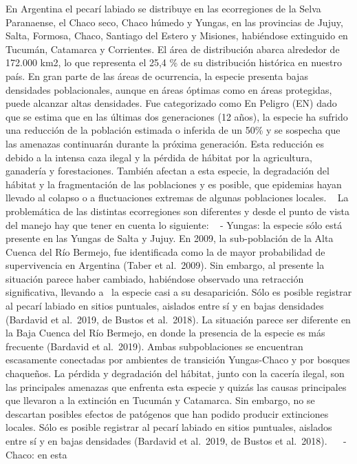 \documentclass[
  x11names]{article}
\begin{document}
En Argentina el pecarí labiado se distribuye en las ecorregiones de la
Selva Paranaense, el Chaco seco, Chaco húmedo y Yungas, en las
provincias de Jujuy, Salta, Formosa, Chaco, Santiago del Estero y
Misiones, habiéndose extinguido en Tucumán, Catamarca y Corrientes. El
área de distribución abarca alrededor de 172.000 km2, lo que representa
el 25,4 \% de su distribución histórica en nuestro país. En gran parte
de las áreas de ocurrencia, la especie presenta bajas densidades
poblacionales, aunque en áreas óptimas como en áreas protegidas, puede
alcanzar altas densidades. Fue categorizado como En Peligro (EN) dado
que se estima que en las últimas dos generaciones (12 años), la especie
ha sufrido una reducción de la población estimada o inferida de un 50\%
y se sospecha que las amenazas continuarán durante la próxima
generación. Esta reducción es debido a la intensa caza ilegal y la
pérdida de hábitat por la agricultura, ganadería y forestaciones.
También afectan a esta especie, la degradación del hábitat y la
fragmentación de las poblaciones y es posible, que epidemias hayan
llevado al colapso o a fluctuaciones extremas de algunas poblaciones
locales. ~ La problemática de las distintas ecorregiones son diferentes
y desde el punto de vista del manejo hay que tener en cuenta lo
siguiente: ~ - Yungas: la especie sólo está presente en las Yungas de
Salta y Jujuy. En 2009, la sub-población de la Alta Cuenca del Río
Bermejo, fue identificada como la de mayor probabilidad de supervivencia
en Argentina (Taber et al.~2009). Sin embargo, al presente la situación
parece haber cambiado, habiéndose observado una retracción
significativa, llevando a~ la especie casi a su desaparición. Sólo es
posible registrar al pecarí labiado en sitios puntuales, aislados entre
sí y en bajas densidades (Bardavid et al.~2019, de Bustos et al.~2018).
La situación parece ser diferente en la Baja Cuenca del Río Bermejo, en
donde la presencia de la especie es más frecuente (Bardavid et
al.~2019). Ambas subpoblaciones se encuentran escasamente conectadas por
ambientes de transición Yungas-Chaco y por bosques chaqueños. La pérdida
y degradación del hábitat, junto con la cacería ilegal, son las
principales amenazas que enfrenta esta especie y quizás las causas
principales que llevaron a la extinción en Tucumán y Catamarca. Sin
embargo, no se descartan posibles efectos de patógenos que han podido
producir extinciones locales. Sólo es posible registrar al pecarí
labiado en sitios puntuales, aislados entre sí y en bajas densidades
(Bardavid et al.~2019, de Bustos et al.~2018).~ ~ - Chaco: en esta
\end{document}
